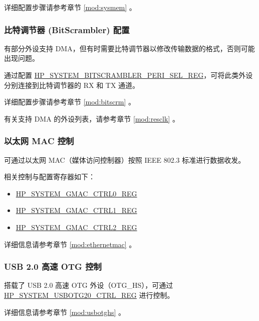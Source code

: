 \documentclass[main\_\_CN.tex]{subfiles}
\begin{document}
详细配置步骤请参考章节 \ref{mod:sysmem} \textit{}。

\subsubsection{比特调节器 (BitScrambler) 配置}

\chipname{} 有部分外设支持 DMA，但有时需要比特调节器以修改传输数据的格式，否则可能出现问题。

通过配置 \hyperref[regdesc:HPSYSTEMBITSCRAMBLERPERISELREG]{HP\_SYSTEM\_BITSCRAMBLER\_PERI\_SEL\_REG}，可将此类外设分别连接到比特调节器的 RX 和 TX 通道。

详细配置步骤请参考章节 \ref{mod:bitscrm} \textit{}。

有关支持 DMA 的外设列表，请参考章节 \ref{mod:resclk} \textit{}。

\subsubsection{以太网 MAC 控制}

\chipname{} 可通过以太网 MAC（媒体访问控制器）按照 IEEE 802.3 标准进行数据收发。

相关控制与配置寄存器如下：

\begin{itemize}
    \item \hyperref[regdesc:HPSYSTEMGMACCTRL0REG]{HP\_SYSTEM\_GMAC\_CTRL0\_REG}
    \item \hyperref[regdesc:HPSYSTEMGMACCTRL1REG]{HP\_SYSTEM\_GMAC\_CTRL1\_REG}
    \item \hyperref[regdesc:HPSYSTEMGMACCTRL2REG]{HP\_SYSTEM\_GMAC\_CTRL2\_REG}
\end{itemize}

详细信息请参考章节 \ref{mod:ethernetmac} \textit{}。

\subsubsection{USB 2.0 高速 OTG 控制}

\chipname{} 搭载了 USB 2.0 高速 OTG 外设（OTG\_HS），可通过 \hyperref[regdesc:HPSYSTEMUSBOTG20CTRLREG]{HP\_SYSTEM\_USBOTG20\_CTRL\_REG} 进行控制。


详细信息请参考章节 \ref{mod:usbotghs} \textit{}。
\end{document}
